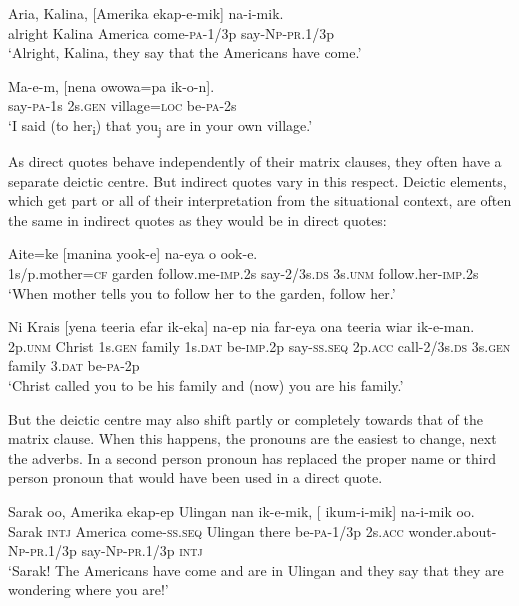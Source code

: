 \ea%
\label{ex:8:x1585}
\gll Aria,  Kalina,  [Amerika  ekap-e-mik]  na-i-mik. \\
alright  Kalina  America  come-\textsc{pa}-1/3p say-\textsc{Np}-\textsc{pr}.1/3p\\
\glt`Alright, Kalina, they say that the Americans have come.'
\z


\ea%
\label{ex:8:x1587}
\gll Ma-e-m,  [nena  owowa=pa  ik-o-n].\\
say-\textsc{pa}-1s 2s.\textsc{gen} village=\textsc{loc} be-\textsc{pa}-2s\\
\glt`I said (to her\textsubscript{i}) that you\textsubscript{j} are in your own village.'
\z


As direct quotes behave independently of their matrix clauses, they often have a separate deictic centre. But indirect quotes vary in this respect. Deictic elements, which get part or all of their interpretation from the situational context, are often the same in indirect quotes as they would be in direct quotes: 

\ea%
\label{ex:8:x1584}
\gll Aite=ke  [manina  yook-e]  na-eya  o ook-e.\\
1s/p.mother=\textsc{cf} garden follow.me-\textsc{imp}.2s say-2/3s.\textsc{ds} 3s.\textsc{unm} follow.her-\textsc{imp}.2s\\
\glt`When mother tells you to follow her to the garden, follow her.'
\z


\ea%
\label{ex:8:x1280}
\gll Ni  Krais  [yena  teeria  efar  ik-eka]  na-ep nia  far-eya  ona  teeria  wiar  ik-e-man.\\
2p.\textsc{unm} Christ 1s.\textsc{gen} family 1s.\textsc{dat} be-\textsc{imp}.2p say-\textsc{ss}.\textsc{seq} 2p.\textsc{acc} call-2/3s.\textsc{ds} 3s.\textsc{gen} family 3.\textsc{dat} be-\textsc{pa}-2p\\
\glt`Christ called you to be his family and (now) you are his family.'
\z


But the deictic centre may also shift partly or completely towards that of the matrix clause. When this happens, the pronouns are the easiest to change, next the adverbs. In  a second person pronoun has replaced the proper name or third person pronoun that would have been used in a direct quote.

\ea%
\label{ex:8:x1586}
\gll Sarak  oo,  Amerika  ekap-ep  Ulingan  nan  ik-e-mik, [  ikum-i-mik]  na-i-mik  oo. \\
Sarak \textsc{intj} America come-\textsc{ss}.\textsc{seq} Ulingan  there be-\textsc{pa}-1/3p 2s.\textsc{acc} wonder.about-\textsc{Np}-\textsc{pr}.1/3p say-\textsc{Np}-\textsc{pr}.1/3p \textsc{intj}\\
\glt`Sarak! The Americans have come and are in Ulingan and they say that they are wondering where you are!'
\z


